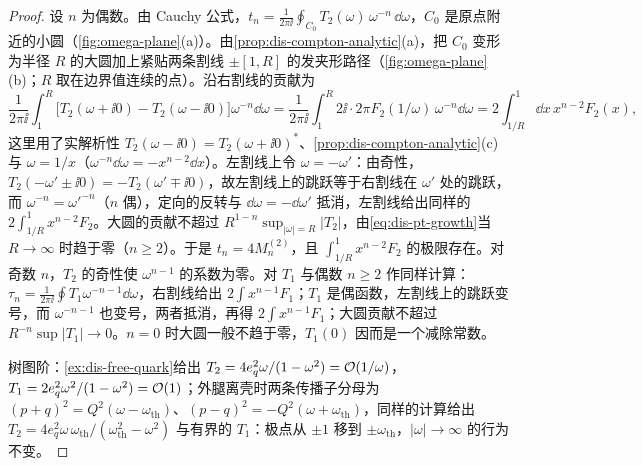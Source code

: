 \begin{proof}
设 $n$ 为偶数。由 Cauchy 公式，$t_n=\frac1{2\pi\ii}\oint_{C_0}T_2(\omega)\,\omega^{-n}\,\dd\omega$，$C_0$ 是原点附近的小圆（\cref{fig:omega-plane}(a)）。由\cref{prop:dis-compton-analytic}(a)，把 $C_0$ 变形为半径 $R$ 的大圆加上紧贴两条割线 $\pm[1,R]$ 的发夹形路径（\cref{fig:omega-plane}(b)；$R$ 取在边界值连续的点）。沿右割线的贡献为
\[
\frac1{2\pi\ii}\int_1^R\Big[T_2(\omega+\ii0)-T_2(\omega-\ii0)\Big]\omega^{-n}\dd\omega
=\frac1{2\pi\ii}\int_1^R2\ii\cdot2\pi F_2(1/\omega)\,\omega^{-n}\dd\omega=2\int_{1/R}^1\dd x\,x^{n-2}F_2(x),
\]
这里用了实解析性 $T_2(\omega-\ii0)=T_2(\omega+\ii0)^*$、\cref{prop:dis-compton-analytic}(c) 与 $\omega=1/x$（$\omega^{-n}\dd\omega=-x^{n-2}\dd x$）。左割线上令 $\omega=-\omega'$：由奇性，$T_2(-\omega'\pm\ii0)=-T_2(\omega'\mp\ii0)$，故左割线上的跳跃等于右割线在 $\omega'$ 处的跳跃，而 $\omega^{-n}=\omega'^{-n}$（$n$ 偶），定向的反转与 $\dd\omega=-\dd\omega'$ 抵消，左割线给出同样的 $2\int_{1/R}^1x^{n-2}F_2$。大圆的贡献不超过 $R^{1-n}\sup_{|\omega|=R}|T_2|$，由\cref{eq:dis-pt-growth}当 $R\to\infty$ 时趋于零（$n\ge2$）。于是 $t_n=4M^{(2)}_n$，且 $\int_{1/R}^1x^{n-2}F_2$ 的极限存在。对奇数 $n$，$T_2$ 的奇性使 $\omega^{n-1}$ 的系数为零。对 $T_1$ 与偶数 $n\ge2$ 作同样计算：$\tau_n=\frac1{2\pi\ii}\oint T_1\omega^{-n-1}\dd\omega$，右割线给出 $2\int x^{n-1}F_1$；$T_1$ 是偶函数，左割线上的跳跃变号，而 $\omega^{-n-1}$ 也变号，两者抵消，再得 $2\int x^{n-1}F_1$；大圆贡献不超过 $R^{-n}\sup|T_1|\to0$。$n=0$ 时大圆一般不趋于零，$T_1(0)$ 因而是一个减除常数。

树图阶：\cref{ex:dis-free-quark}给出 $T_2=4e_q^2\omega/(1-\omega^2)=\mathcal{O}\!\left(1/\omega\right)$，$T_1=2e_q^2\omega^2/(1-\omega^2)=\mathcal{O}\!\left(1\right)$；外腿离壳时两条传播子分母为 $(p+q)^2=Q^2(\omega-\omega_{\mathrm{th}})$、$(p-q)^2=-Q^2(\omega+\omega_{\mathrm{th}})$，同样的计算给出 $T_2=4e_q^2\omega\,\omega_{\mathrm{th}}/(\omega_{\mathrm{th}}^2-\omega^2)$ 与有界的 $T_1$：极点从 $\pm1$ 移到 $\pm\omega_{\mathrm{th}}$，$|\omega|\to\infty$ 的行为不变。
\end{proof}


